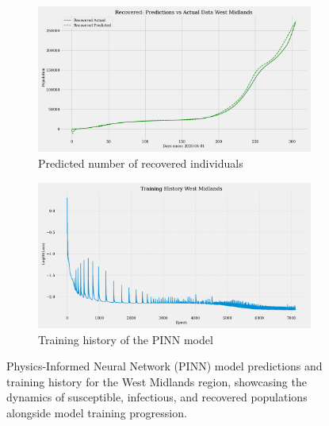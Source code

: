 \documentclass[12pt]{article}
\begin{document}
\begin{figure}[h]
    \begin{subfigure}[t]{0.45\textwidth}
        \includegraphics[width=\textwidth]{images/pinn/R_predictions_West Midlands.pdf}
        \caption{Predicted number of recovered individuals}
        \label{fig:R_predictions_West Midlands}
    \end{subfigure}
    \hfill %
    \begin{subfigure}[t]{0.45\textwidth}
        \centering
        \includegraphics[width=\textwidth]{images/pinn/Training_History_West Midlands.pdf}
        \caption{Training history of the PINN model}
        \label{fig:Training_History_West Midlands}
    \end{subfigure}
    \caption{Physics-Informed Neural Network (PINN) model predictions and training history for the West Midlands region, showcasing the dynamics of susceptible, infectious, and recovered populations alongside model training progression.}
    \label{fig:PINN_West Midlands_Comprehensive}
\end{figure}
\end{document}
